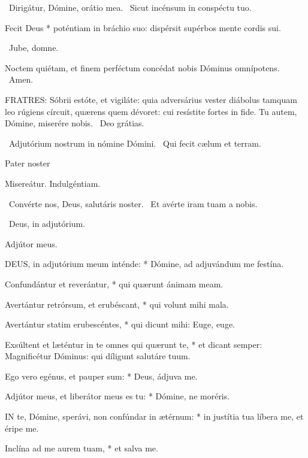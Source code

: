 \V\ Dirigátur, Dómine, orátio mea. \R\ Sicut incénsum in conspéctu tuo.

 Fecit Deus * poténtiam in bráchio suo: dispérsit supérbos mente cordis sui.



\V\ Jube, domne.

 Noctem quiétam, et finem perféctum concédat nobis Dóminus omnípotens. \R\ Amen.


\lettrine[lines=2]{F}{RATRES}: Sóbrii estóte, et vigiláte: quia adversárius vester diábolus tamquam leo rúgiens círcuit, quærens quem dévoret: cui resístite fortes in fide. Tu autem, Dómine, miserére nobis. \R\ Deo grátias.

\V\ Adjutórium nostrum in nómine Dómini. \R\ Qui fecit cælum et terram.

Pater noster 

 Misereátur. Indulgéntiam.

\V\ Convérte nos, Deus, salutáris noster. \R\ Et avérte iram tuam a nobis.

\V\ Deus, in adjutórium.

 Adjútor meus.


\lettrine[lines=2]{D}{EUS}, in adjutórium meum inténde: * Dómine, ad adjuvándum me festína.

Confundántur et reverántur, * qui quærunt ánimam meam.

Avertántur retrórsum, et erubéscant, * qui volunt mihi mala.

Avertántur statim erubescéntes, * qui dicunt mihi: Euge, euge.

Exsúltent et læténtur in te omnes qui quærunt te, * et dicant semper: Magnificétur Dóminus: qui díligunt salutáre tuum.

Ego vero egénus, et pauper sum: * Deus, ádjuva me.

Adjútor meus, et liberátor meus es tu: * Dómine, ne moréris.


\lettrine[lines=2]{I}{N} te, Dómine, sperávi, non confúndar in ætérnum: * in justítia tua líbera me, et éripe me.

Inclína ad me aurem tuam, * et salva me.

